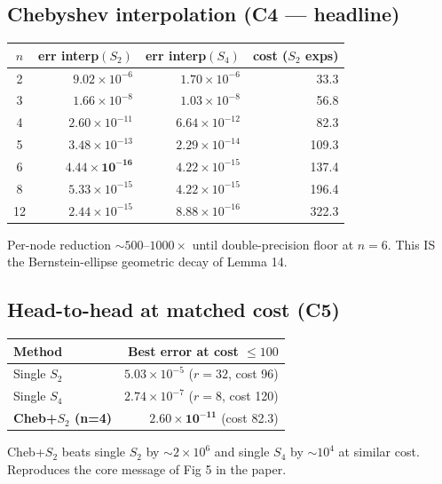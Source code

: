 \documentclass[11pt]{article}
\begin{document}
\subsection{Chebyshev interpolation (C4 --- headline)}
\begin{table}[h]
\centering
\begin{tabular}{crrr}
\toprule
$n$ & err interp$(S_2)$ & err interp$(S_4)$ & cost ($S_2$ exps) \\
\midrule
2  & $9.02\!\times\!10^{-6}$   & $1.70\!\times\!10^{-6}$   & 33.3  \\
3  & $1.66\!\times\!10^{-8}$   & $1.03\!\times\!10^{-8}$   & 56.8  \\
4  & $2.60\!\times\!10^{-11}$  & $6.64\!\times\!10^{-12}$  & 82.3  \\
5  & $3.48\!\times\!10^{-13}$  & $2.29\!\times\!10^{-14}$  & 109.3 \\
6  & $\mathbf{4.44\times 10^{-16}}$ & $4.22\!\times\!10^{-15}$ & 137.4 \\
8  & $5.33\!\times\!10^{-15}$  & $4.22\!\times\!10^{-15}$  & 196.4 \\
12 & $2.44\!\times\!10^{-15}$  & $8.88\!\times\!10^{-16}$  & 322.3 \\
\bottomrule
\end{tabular}
\end{table}
Per-node reduction $\sim 500\text{--}1000\times$ until double-precision
floor at $n=6$. This IS the Bernstein-ellipse geometric decay of
Lemma 14.

\subsection{Head-to-head at matched cost (C5)}
\begin{table}[h]
\centering
\begin{tabular}{lr}
\toprule
Method & Best error at cost $\le 100$ \\
\midrule
Single $S_2$          & $5.03\!\times\!10^{-5}$ ($r=32$, cost 96) \\
Single $S_4$          & $2.74\!\times\!10^{-7}$ ($r=8$, cost 120) \\
\textbf{Cheb+$S_2$ (n=4)} & $\mathbf{2.60\times 10^{-11}}$ (cost 82.3) \\
\bottomrule
\end{tabular}
\end{table}
Cheb+$S_2$ beats single $S_2$ by $\sim\!2\!\times\!10^{6}$ and single
$S_4$ by $\sim\!10^{4}$ at similar cost. Reproduces the core message of
Fig 5 in the paper.
\end{document}
